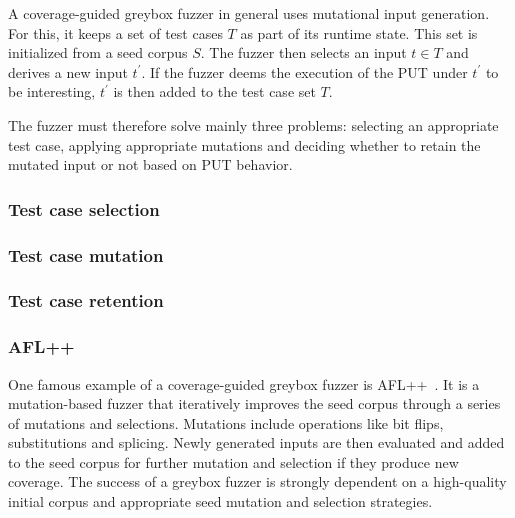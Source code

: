 A coverage-guided greybox fuzzer in general uses mutational input generation.
For this, it keeps a set of test cases $T$ as part of its runtime state.
This set is initialized from a seed corpus $S$.
The fuzzer then selects an input $t\in T$ and derives a new input $t^\prime$.
If the fuzzer deems the execution of the PUT under $t^\prime$ to be interesting, $t^\prime$
is then added to the test case set $T$.

The fuzzer must therefore solve mainly three problems: selecting an appropriate
test case, applying appropriate mutations and deciding whether to retain the
mutated input or not based on PUT behavior.

\subsubsection{Test case selection}


\subsubsection{Test case mutation}


\subsubsection{Test case retention}


\subsubsection{AFL++}

One famous example of a coverage-guided greybox fuzzer is AFL++~\cite{fioraldi_afl_nodate}.
It is a mutation-based fuzzer that iteratively improves the seed corpus through
a series of mutations and selections.
Mutations include operations like bit flips, substitutions and splicing.
Newly generated inputs are then evaluated and added to the seed corpus for further
mutation and selection if they produce new coverage.
The success of a greybox fuzzer is strongly dependent on a high-quality initial
corpus and appropriate seed mutation and selection strategies.


